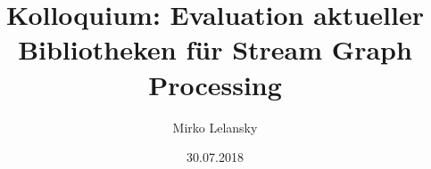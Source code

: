 \documentclass[a4paper, fontsize=11pt]{beamer}
\begin{document}
\author{Mirko Lelansky}
\title{Kolloquium: Evaluation aktueller Bibliotheken für Stream Graph Processing}
\date{30.07.2018}
\maketitle
\tableofcontents
\clearpage
\end{document}
